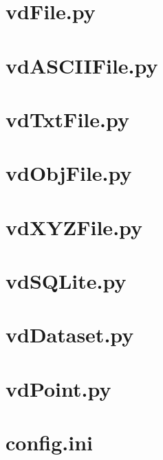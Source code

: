 \documentclass[a4paper,12pt,bibliography=totoc, listof=totoc,titlepage,pointlessnumbers]{scrreprt}
\begin{document}
\begin{appendices}
\section{vdFile.py}
\label{a:vdFile.py}


\section{vdASCIIFile.py}
\label{a:vdASCIIFile.py}


\section{vdTxtFile.py}
\label{a:vdTxtFile.py}


\section{vdObjFile.py}
\label{a:vdObjFile.py}


\section{vdXYZFile.py}
\label{a:vdXYZFile.py}


\section{vdSQLite.py}
\label{a:vdSQLite.py}


\section{vdDataset.py}
\label{a:vdDataset.py}


\section{vdPoint.py}
\label{a:vdPoint.py}


\section{config.ini}
\label{a:config.ini}



\end{appendices}
\end{document}

